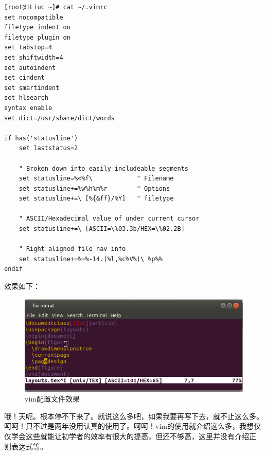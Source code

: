 \begin{verbatim}
[root@iLiuc ~]# cat ~/.vimrc
set nocompatible
filetype indent on
filetype plugin on
set tabstop=4
set shiftwidth=4
set autoindent
set cindent
set smartindent
set hlsearch
syntax enable
set dict=/usr/share/dict/words

if has('statusline')
    set laststatus=2

    " Broken down into easily includeable segments
    set statusline=%<%f\            " Filename
    set statusline+=%w%h%m%r        " Options
    set statusline+=\ [%{&ff}/%Y]   " filetype

    " ASCII/Hexadecimal value of under current cursor
    set statusline+=\ [ASCII=\%03.3b/HEX=\%02.2B]

    " Right aligned file nav info
    set statusline+=%=%-14.(%l,%c%V%)\ %p%%
endif
\end{verbatim}

效果如下：

\begin{figure}[htbp]
  \centering
  \includegraphics[width=.75\textwidth]{img/vimrc.png}
  \caption{vim配置文件效果}
  \label{fig:vimConf}
\end{figure}

哦！天呢。根本停不下来了。就说这么多吧，如果我要再写下去，就不止这么多。
呵呵！只不过是两年没用认真的使用了。呵呵！vim的使用就介绍这么多，我想仅
仅学会这些就能让初学者的效率有很大的提高，但还不够高，这里并没有介绍正
则表达式等。
